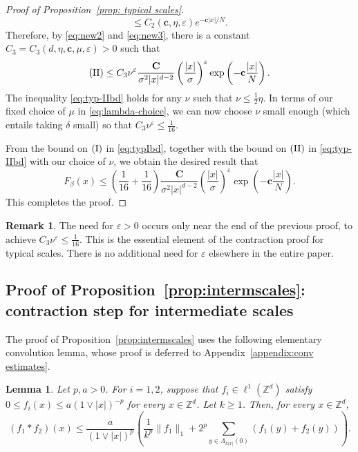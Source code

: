 \documentclass[11pt,a4paper]{article}
\numberwithin{equation}{section}
\theoremstyle{plain}
\newtheorem{Lem}[Thm]{Lemma}
\theoremstyle{definition}
\newtheorem{Rem}[Thm]{Remark}
\newcommand\1{\mathds{1}}
\newcommand\bfc{\mathbf{c}}
\newcommand\bfC{\mathbf{C}}
\begin{document}
\begin{proof}[Proof of Proposition~\textup{\ref{prop: typical scales}}]
\begin{equation}
    \le
    C_2(\bfc,\eta,\varepsilon)e^{- \bfc |x|/N}.
\end{equation}
Therefore, by \eqref{eq:new2}
and \eqref{eq:new3},
there is a constant $C_3=C_3(d,\eta,\bfc,\mu,\varepsilon)>0$ such that
\begin{equation}
\label{eq:typ-IIbd}
    ({\rm II}) \le C_3 \nu^\varepsilon
    \frac{\bfC}{\sigma^2|x|^{d-2}}
    \left(\frac{|x|}{\sigma}\right)^\varepsilon
    \exp\left(-\bfc \frac{|x|}{N}\right)
    .
\end{equation}
The inequality \eqref{eq:typ-IIbd} holds for any $\nu$ such that  $\nu \le \frac 12 \eta$.
In terms of our fixed choice of $\mu$ in \eqref{eq:lambda-choice},
we can now choose $\nu$ small enough (which entails taking $\delta$ small) so that $C_3\nu^\varepsilon \le \frac{1}{16}$.

From the bound on $({\rm I})$ in \eqref{eq:typIbd}, together with the bound on $({\rm II})$
in \eqref{eq:typ-IIbd} with our choice of $\nu$, we obtain the desired result
that
\begin{equation}
    F_\beta(x) \le \left( \frac{1}{16} + \frac{1}{16} \right)
    \frac{\bfC}{\sigma^2|x|^{d-2}}
    \left(\frac{|x|}{\sigma}\right)^\varepsilon
    \exp\left(-\bfc \frac{|x|}{N}\right).
\end{equation}
This completes the proof.
\end{proof}





\begin{Rem}
The need for $\varepsilon >0$ occurs only near the end of
the previous proof, to achieve $C_3\nu^\varepsilon \le \frac 1{16}$.
This is the essential element of the contraction proof for typical scales.
There is no additional need for $\varepsilon$ elsewhere in the entire paper.
\end{Rem}



\subsection{Proof of Proposition~\ref{prop:intermscales}: contraction step for intermediate scales}
\label{sec:contraction-intermediate}


The proof of Proposition~\ref{prop:intermscales} uses the following elementary convolution lemma,
whose proof is deferred to Appendix~\ref{appendix:conv estimates}.


\begin{Lem}
\label{lemma:fstarf}
Let $p,a>0$.
For $i=1,2$, suppose that $f_i \in \ell^1(\mathbb Z^d)$
satisfy $0 \le f_i(x) \le a(1\vee |x|)^{-p}$ for every $x\in\mathbb Z^d$.
Let $k\ge 1$.
Then, for every $x\in \mathbb Z^d$,
\begin{equation}
    (f_1*f_2)(x)
    \le
    \frac{a}{(1\vee |x|)^p}
    \left(  \frac{1}{k^{p}}  \|f_1\|_1
    + 2^{p} \sum_{y \in \Lambda_{k|x|}(0)}(f_1(y)+f_2(y)) \right).
\end{equation}
\end{Lem}
\end{document}
